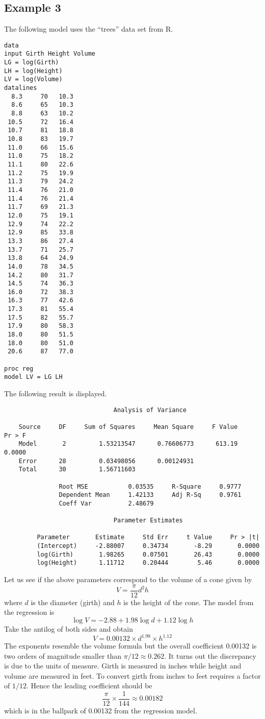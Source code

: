 \documentclass[12pt]{article}
\begin{document}
\subsection*{Example 3}
The following model uses the ``trees'' data set from R.

\begin{Verbatim}
data
input Girth Height Volume
LG = log(Girth)
LH = log(Height)
LV = log(Volume)
datalines
  8.3     70   10.3
  8.6     65   10.3
  8.8     63   10.2
 10.5     72   16.4
 10.7     81   18.8
 10.8     83   19.7
 11.0     66   15.6
 11.0     75   18.2
 11.1     80   22.6
 11.2     75   19.9
 11.3     79   24.2
 11.4     76   21.0
 11.4     76   21.4
 11.7     69   21.3
 12.0     75   19.1
 12.9     74   22.2
 12.9     85   33.8
 13.3     86   27.4
 13.7     71   25.7
 13.8     64   24.9
 14.0     78   34.5
 14.2     80   31.7
 14.5     74   36.3
 16.0     72   38.3
 16.3     77   42.6
 17.3     81   55.4
 17.5     82   55.7
 17.9     80   58.3
 18.0     80   51.5
 18.0     80   51.0
 20.6     87   77.0

proc reg
model LV = LG LH
\end{Verbatim}

The following result is displayed.

\begin{Verbatim}
                              Analysis of Variance

    Source     DF     Sum of Squares     Mean Square     F Value     Pr > F
    Model       2         1.53213547      0.76606773      613.19     0.0000
    Error      28         0.03498056      0.00124931                       
    Total      30         1.56711603                                       

               Root MSE           0.03535     R-Square     0.9777
               Dependent Mean     1.42133     Adj R-Sq     0.9761
               Coeff Var          2.48679                        

                              Parameter Estimates

         Parameter       Estimate     Std Err     t Value     Pr > |t|
         (Intercept)     -2.88007     0.34734       -8.29       0.0000
         log(Girth)       1.98265     0.07501       26.43       0.0000
         log(Height)      1.11712     0.20444        5.46       0.0000
\end{Verbatim}

Let us see if the above parameters correspond to the volume of a cone
given by
$$
V=\frac{\pi}{12}d^2h
$$
where $d$ is the diameter (girth) and $h$ is the height of the cone.
The model from the regression is
$$
\log V=-2.88+1.98\log d+1.12\log h
$$
Take the antilog of both sides and obtain
$$
V=0.00132\times d^{1.98}\times h^{1.12}
$$
The exponents resemble the volume formula but the overall coefficient 0.00132
is two orders of magnitude smaller than $\pi/12\approx0.262$.
It turns out the discrepancy is due to the units of measure.
Girth is measured in inches while height and volume are measured in feet.
To convert girth from inches to feet requires a factor of $1/12$.
Hence the leading coefficient should be
$$
\frac{\pi}{12}\times\frac{1}{144}\approx0.00182
$$
which is in the ballpark of 0.00132 from the regression model.
\end{document}
